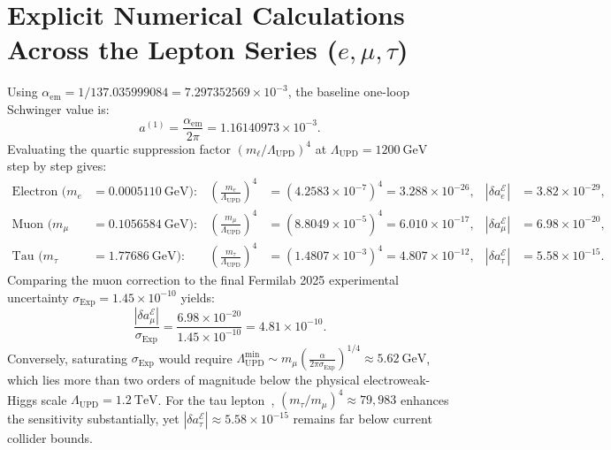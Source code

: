 \documentclass[11pt,a4paper]{article}
\begin{document}
\section{Explicit Numerical Calculations Across the Lepton Series ($e, \mu, \tau$)}
Using $\alpha_{\mathrm{em}} = 1/137.035999084 = 7.297352569 \times 10^{-3}$, the baseline one-loop Schwinger value is:
\begin{equation}
a^{(1)} = \frac{\alpha_{\mathrm{em}}}{2\pi} = 1.16140973 \times 10^{-3}.
\end{equation}
Evaluating the quartic suppression factor $(m_\ell/\Lambda_{\mathrm{UPD}})^4$ at $\Lambda_{\mathrm{UPD}} = 1200\ \mathrm{GeV}$ step by step gives:
\begin{align}
\text{Electron } (m_e &= 0.0005110\ \mathrm{GeV}): & \left(\frac{m_e}{\Lambda_{\mathrm{UPD}}}\right)^4 &= (4.2583 \times 10^{-7})^4 = 3.288 \times 10^{-26}, & |\delta a_e^{\mathcal{E}}| &= 3.82 \times 10^{-29}, \\
\text{Muon } (m_\mu &= 0.1056584\ \mathrm{GeV}): & \left(\frac{m_\mu}{\Lambda_{\mathrm{UPD}}}\right)^4 &= (8.8049 \times 10^{-5})^4 = 6.010 \times 10^{-17}, & |\delta a_\mu^{\mathcal{E}}| &= 6.98 \times 10^{-20}, \\
\text{Tau } (m_\tau &= 1.77686\ \mathrm{GeV}): & \left(\frac{m_\tau}{\Lambda_{\mathrm{UPD}}}\right)^4 &= (1.4807 \times 10^{-3})^4 = 4.807 \times 10^{-12}, & |\delta a_\tau^{\mathcal{E}}| &= 5.58 \times 10^{-15}.
\end{align}
Comparing the muon correction to the final Fermilab 2025 experimental uncertainty $\sigma_{\mathrm{Exp}} = 1.45 \times 10^{-10}$ yields:
\begin{equation}
\frac{|\delta a_\mu^{\mathcal{E}}|}{\sigma_{\mathrm{Exp}}} = \frac{6.98 \times 10^{-20}}{1.45 \times 10^{-10}} = 4.81 \times 10^{-10}.
\end{equation}
Conversely, saturating $\sigma_{\mathrm{Exp}}$ would require $\Lambda_{\mathrm{UPD}}^{\min} \sim m_\mu \left(\frac{\alpha}{2\pi \sigma_{\mathrm{Exp}}}\right)^{1/4} \approx 5.62\ \mathrm{GeV}$, which lies more than two orders of magnitude below the physical electroweak-Higgs scale $\Lambda_{\mathrm{UPD}} = 1.2\ \mathrm{TeV}$. For the tau lepton~\cite{eidelman2007}, $(m_\tau/m_\mu)^4 \approx 79,983$ enhances the sensitivity substantially, yet $|\delta a_\tau^{\mathcal{E}}| \approx 5.58 \times 10^{-15}$ remains far below current collider bounds.
\end{document}
